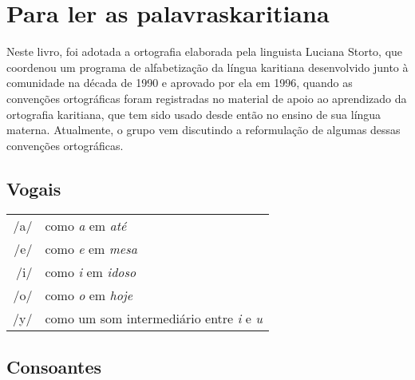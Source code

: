 \chapter[Para ler as palavras karitiana]{Para ler as palavras\break karitiana}

Neste livro, foi adotada a ortografia elaborada pela linguista Luciana
Storto, que coordenou um programa de alfabetização da língua karitiana
desenvolvido junto à comunidade na década de 1990 e aprovado por ela em
1996, quando as convenções ortográficas foram registradas no material de
apoio ao aprendizado da ortografia karitiana, que tem sido usado desde
então no ensino de sua língua materna. Atualmente, o grupo vem
discutindo a reformulação de algumas dessas convenções ortográficas.

\section{Vogais}

\begingroup
\begin{tabular}{rl}
/a/ & como \textit{a} em \textit{até}\\
/e/ & como \textit{e} em \textit{mesa}\\
/i/ & como \textit{i} em \textit{idoso}\\
/o/ & como \textit{o} em \textit{hoje}\\
/y/ & como um som intermediário entre \textit{i} e \textit{u}\protect\footnotemark\\
\end{tabular}


\endgroup

\section{Consoantes}

